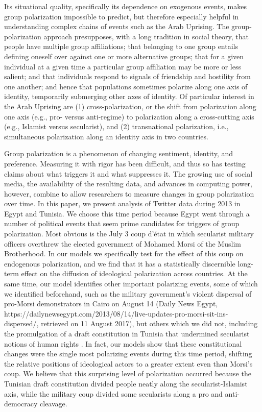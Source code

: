 \documentclass[12pt]{article}
\begin{document}
Its situational quality, specifically its dependence on exogenous events, makes group polarization impossible to predict, but therefore especially helpful in understanding complex chains of events such as the Arab Uprising.  The group-polarization approach presupposes, with a long tradition in social theory, that people have multiple group affiliations; that belonging to one group entails defining oneself over against one or more alternative groups; that for a given individual at a given time a particular group affiliation may be more or less salient; and that individuals respond to signals of friendship and hostility from one another; and hence that populations sometimes polarize along one axis of identity, temporarily submerging other axes of identity.  Of particular interest in the Arab Uprising are (1) cross-polarization, or the shift from polarization along one axis (e.g., pro- versus anti-regime) to polarization along a cross-cutting axis (e.g., Islamist versus secularist), and (2) transnational polarization, i.e., simultaneous polarization along an identity axis in two countries.

Group polarization is a phenomenon of changing sentiment, identity, and preference.  Measuring it with rigor has been difficult, and thus so has testing claims about what triggers it and what suppresses it.  The growing use of social media, the availability of the resulting data, and advances in computing power, however, combine to allow researchers to measure changes in group polarization over time.  In this paper, we present analysis of Twitter data during 2013 in Egypt and Tunisia.  We choose this time period because Egypt went through a number of political events that seem prime candidates for triggers of group polarization.  Most obvious is the July 3 coup d'état in which secularist military officers overthrew the elected government of Mohamed Morsi of the Muslim Brotherhood. In our models we specifically test for the effect of this coup on endogenous polarization, and we find that it has a statistically discernible long-term effect on the diffusion of ideological polarization across countries. At the same time, our model identifies other important polarizing events, some of which we identified beforehand, such as the military government's violent dispersal of pro-Morsi demonstrators in Cairo on August 14 (Daily News Egypt, https://dailynewsegypt.com/2013/08/14/live-updates-pro-morsi-sit-ins-dispersed/, retrieved on 11 August 2017), but others which we did not, including the promulgation of a draft constitution in Tunisia that undermined secularist notions of human rights \parencite{hrw2013}. In fact, our models show that these constitutional changes were the single most polarizing events during this time period, shifting the relative positions of ideological actors to a greater extent even than Morsi's coup. We believe that this surprising level of polarization occurred because the Tunisian draft constitution divided people neatly along the secularist-Islamist axis, while the military coup divided some secularists along a pro and anti-democracy cleavage.
\end{document}
